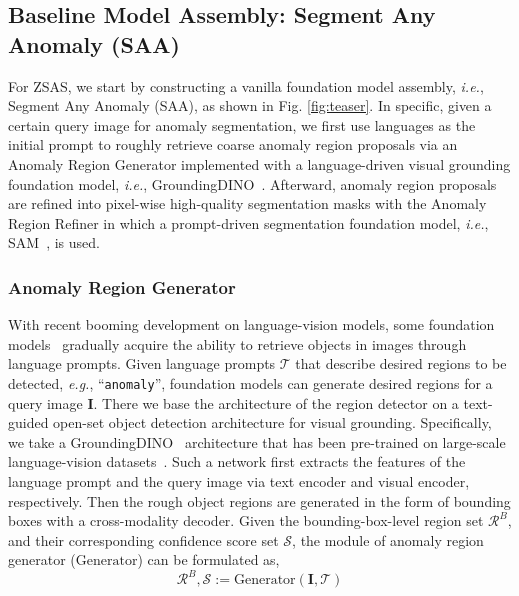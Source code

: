 \subsection{Baseline Model Assembly: Segment Any Anomaly (SAA) }

For ZSAS, we start by constructing a vanilla foundation model assembly, \textit{i.e.}, Segment Any Anomaly (SAA), as shown in Fig. \ref{fig:teaser}. In specific, given a certain query image for anomaly segmentation, we first use languages as the initial prompt to roughly retrieve coarse anomaly region proposals via an Anomaly Region Generator implemented with a language-driven visual grounding foundation model, \textit{i.e.}, GroundingDINO~\cite{liu2023grounding}. Afterward, anomaly region proposals are refined into pixel-wise high-quality segmentation masks with the Anomaly Region Refiner in which a prompt-driven segmentation foundation model, \textit{i.e.}, SAM~\cite{kirillov2023segment}, is used.

\subsubsection{Anomaly Region Generator}

With recent booming development on language-vision models, some foundation models~\cite{clipseg2022,liu2023grounding,zhong2022regionclip} gradually acquire the ability to retrieve objects in images through language prompts. Given language prompts $\mathcal{T}$ that describe desired regions to be detected, \textit{e.g.}, ``\verb|anomaly|'', foundation models can generate desired regions for  a query image $\mathbf{I}$. There we base the architecture of the region detector on a text-guided open-set object detection architecture for visual grounding. Specifically, we take a GroundingDINO~\cite{liu2023grounding} architecture that has been pre-trained on large-scale language-vision datasets~\cite{Laion400}. Such a network first extracts the features of the language prompt and the query image via text encoder and visual encoder, respectively. Then the rough object regions are generated in the form of bounding boxes with a cross-modality decoder. Given the bounding-box-level region set $\mathcal{R}^B$, and their corresponding confidence score set $\mathcal{S}$, the module of anomaly region generator ($\mathrm{Generator}$) can be formulated as,
\begin{equation}
\label{eq:det}
    \mathcal{R}^B, \mathcal{S} := \mathrm{Generator}(\mathbf{I},\mathcal{T})
\end{equation}

